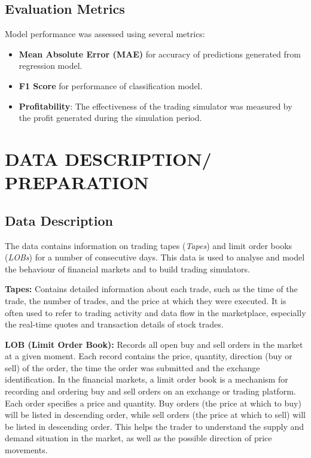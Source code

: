 \documentclass[conference]{IEEEtran}
\begin{document}
\subsection{Evaluation Metrics}
Model performance was assessed using several metrics:
\begin{itemize}
    \item \textbf{Mean Absolute Error (MAE)} for accuracy of predictions generated from regression model.
    \item \textbf{F1 Score} for performance of classification model.
    \item \textbf{Profitability}: The effectiveness of the trading simulator was measured by the profit generated during the simulation period.
\end{itemize}

\section{DATA DESCRIPTION/ PREPARATION}
\subsection{Data Description}
The data contains information on trading tapes (\emph{Tapes}) and limit order books (\emph{LOBs}) for a number of consecutive days. This data is used to analyse and model the behaviour of financial markets and to build trading simulators.

\textbf{Tapes:} Contains detailed information about each trade, such as the time of the trade, the number of trades, and the price at which they were executed. It is often used to refer to trading activity and data flow in the marketplace, especially the real-time quotes and transaction details of stock trades.

\textbf{LOB (Limit Order Book):} Records all open buy and sell orders in the market at a given moment. Each record contains the price, quantity, direction (buy or sell) of the order, the time the order was submitted and the exchange identification. In the financial markets, a limit order book is a mechanism for recording and ordering buy and sell orders on an exchange or trading platform. Each order specifies a price and quantity. Buy orders (the price at which to buy) will be listed in descending order, while sell orders (the price at which to sell) will be listed in descending order. This helps the trader to understand the supply and demand situation in the market, as well as the possible direction of price movements.
\end{document}
